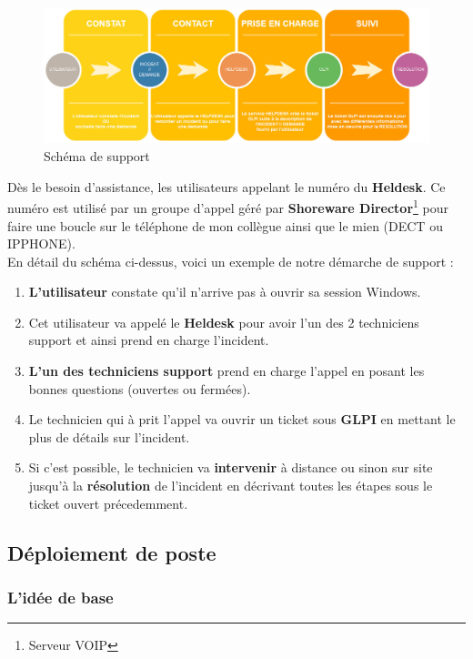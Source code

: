 \documentclass[11pt,a4paper,twoside]{article}
\begin{document}
\begin{figure}[!h]
\centering
\includegraphics[scale=0.42]{Ressources/GLPI.jpg}
\caption{Schéma de support}
\end{figure}

Dès le besoin d'assistance, les utilisateurs appelant le numéro du \textbf{Heldesk}. Ce numéro est utilisé par un groupe d'appel géré par \textbf{Shoreware Director}\footnote{Serveur VOIP} pour faire une boucle sur le téléphone de mon collègue ainsi que le mien (DECT ou IPPHONE). \\

En détail du schéma ci-dessus, voici un exemple de notre démarche de support :

\begin{enumerate}
\item \textbf{L'utilisateur} constate qu'il n'arrive pas à ouvrir sa session Windows.
\item Cet utilisateur va appelé le \textbf{Heldesk} pour avoir l'un des 2 techniciens support et ainsi prend en charge l'incident.
\item \textbf{L'un des techniciens support} prend en charge l'appel en posant les bonnes questions (ouvertes ou fermées).
\item Le technicien qui à prit l'appel va ouvrir un ticket sous \textbf{GLPI} en mettant le plus de détails sur l'incident.
\item  Si c'est possible, le technicien va \textbf{intervenir} à distance ou sinon sur site jusqu'à la \textbf{résolution} de l'incident en décrivant toutes les étapes sous le ticket ouvert précedemment.
\end{enumerate}

\newpage

\subsection{Déploiement de poste}
\subsubsection{L'idée de base}
\end{document}
